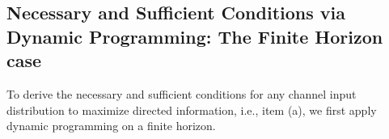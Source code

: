 \documentclass[11pt, a4paper, journal,onecolumn]{IEEEtran}
\begin{document}
\subsection{Necessary and Sufficient Conditions via Dynamic Programming: The Finite Horizon case}\label{subsec.DPandALG}
To derive the necessary and sufficient conditions for any channel input distribution to maximize directed information, i.e., item (a),   we first apply dynamic programming on a finite horizon. 

\end{document}
